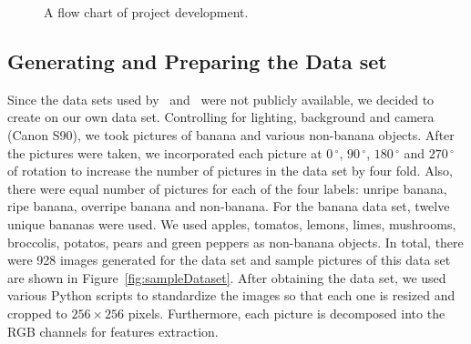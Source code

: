 \documentclass{article} %
\begin{document}
\begin{figure} [h]
\centering 
{
}
\caption{A flow chart of project development.}
\label{fig:flowchart}
 \end{figure}


\subsection{Generating and Preparing the Data set}

Since the data sets used by~\citet{saad2009recognizing} and~\citet{paulraj2009color} were not publicly available, we decided to create on our own data set. Controlling for lighting, background and camera (Canon S90), we took pictures of banana and various non-banana objects. After the pictures were taken, we incorporated each picture at $0\,^{\circ}$, $90\,^{\circ}$, $180\,^{\circ}$ and  $270\,^{\circ}$ of rotation to increase the number of pictures in the data set by four fold. Also, there were equal number of pictures for each of the four labels: unripe banana, ripe banana, overripe banana and non-banana. For the banana data set, twelve unique bananas were used. We used apples, tomatos, lemons, limes, mushrooms, broccolis, potatos, pears and green peppers as non-banana objects. In total, there were 928 images generated for the data set and sample pictures of this data set are shown in Figure~\ref{fig:sampleDataset}. After obtaining the data set, we used various Python scripts to standardize the images so that each one is resized and cropped to $256\times 256$ pixels. Furthermore, each picture is decomposed into the RGB channels for features extraction. 
\end{document}
